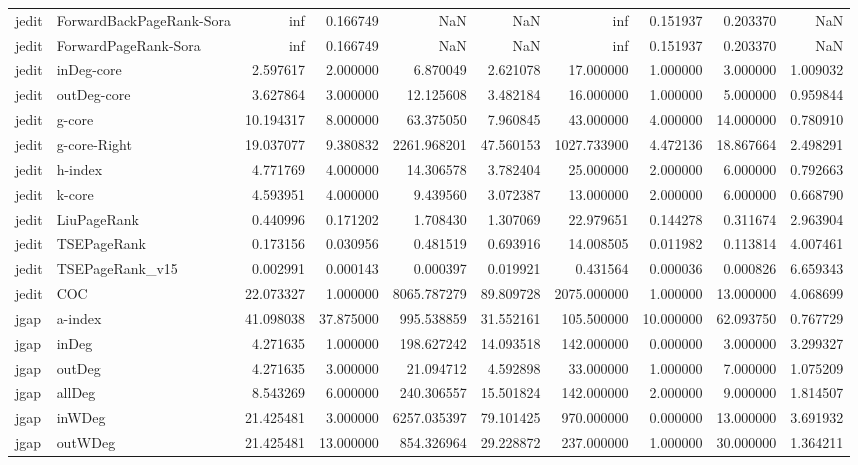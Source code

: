 \begin{tabular}{llrrrrrrrr}
jedit & ForwardBackPageRank-Sora & inf & 0.166749 & NaN & NaN & inf & 0.151937 & 0.203370 & NaN \\
jedit & ForwardPageRank-Sora & inf & 0.166749 & NaN & NaN & inf & 0.151937 & 0.203370 & NaN \\
jedit & inDeg-core & 2.597617 & 2.000000 & 6.870049 & 2.621078 & 17.000000 & 1.000000 & 3.000000 & 1.009032 \\
jedit & outDeg-core & 3.627864 & 3.000000 & 12.125608 & 3.482184 & 16.000000 & 1.000000 & 5.000000 & 0.959844 \\
jedit & g-core & 10.194317 & 8.000000 & 63.375050 & 7.960845 & 43.000000 & 4.000000 & 14.000000 & 0.780910 \\
jedit & g-core-Right & 19.037077 & 9.380832 & 2261.968201 & 47.560153 & 1027.733900 & 4.472136 & 18.867664 & 2.498291 \\
jedit & h-index & 4.771769 & 4.000000 & 14.306578 & 3.782404 & 25.000000 & 2.000000 & 6.000000 & 0.792663 \\
jedit & k-core & 4.593951 & 4.000000 & 9.439560 & 3.072387 & 13.000000 & 2.000000 & 6.000000 & 0.668790 \\
jedit & LiuPageRank & 0.440996 & 0.171202 & 1.708430 & 1.307069 & 22.979651 & 0.144278 & 0.311674 & 2.963904 \\
jedit & TSEPageRank & 0.173156 & 0.030956 & 0.481519 & 0.693916 & 14.008505 & 0.011982 & 0.113814 & 4.007461 \\
jedit & TSEPageRank_v15 & 0.002991 & 0.000143 & 0.000397 & 0.019921 & 0.431564 & 0.000036 & 0.000826 & 6.659343 \\
jedit & COC & 22.073327 & 1.000000 & 8065.787279 & 89.809728 & 2075.000000 & 1.000000 & 13.000000 & 4.068699 \\
jgap & a-index & 41.098038 & 37.875000 & 995.538859 & 31.552161 & 105.500000 & 10.000000 & 62.093750 & 0.767729 \\
jgap & inDeg & 4.271635 & 1.000000 & 198.627242 & 14.093518 & 142.000000 & 0.000000 & 3.000000 & 3.299327 \\
jgap & outDeg & 4.271635 & 3.000000 & 21.094712 & 4.592898 & 33.000000 & 1.000000 & 7.000000 & 1.075209 \\
jgap & allDeg & 8.543269 & 6.000000 & 240.306557 & 15.501824 & 142.000000 & 2.000000 & 9.000000 & 1.814507 \\
jgap & inWDeg & 21.425481 & 3.000000 & 6257.035397 & 79.101425 & 970.000000 & 0.000000 & 13.000000 & 3.691932 \\
jgap & outWDeg & 21.425481 & 13.000000 & 854.326964 & 29.228872 & 237.000000 & 1.000000 & 30.000000 & 1.364211 \\

\end{tabular}
